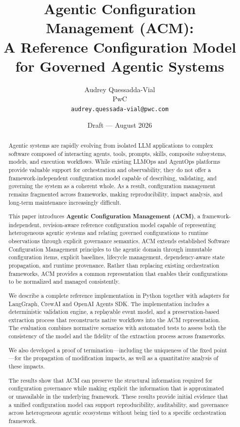 \documentclass[10pt]{article}
\title{\textbf{Agentic Configuration Management (ACM):\\A Reference Configuration Model for Governed Agentic Systems}}
\author{
  Audrey Quessadda-Vial\\
  PwC\\
  \texttt{audrey.quessada-vial@pwc.com}
}
\date{Draft --- August 2026}
\begin{document}
\maketitle

\begin{abstract}

Agentic systems are rapidly evolving from isolated LLM applications to complex software composed of interacting agents, tools, prompts, skills, composite subsystems, models, and execution workflows. While existing LLMOps and AgentOps platforms provide valuable support for orchestration and observability, they do not offer a framework-independent configuration model capable of describing, validating, and governing the system as a coherent whole. As a result, configuration management remains fragmented across frameworks, making reproducibility, impact analysis, and long-term maintenance increasingly difficult.

This paper introduces \textbf{Agentic Configuration Management (ACM)}, a framework-independent, revision-aware reference configuration model capable of representing heterogeneous agentic systems and relating governed configurations to runtime observations through explicit governance semantics. ACM extends established Software Configuration Management principles to the agentic domain through immutable configuration items, explicit baselines, lifecycle management, dependency-aware state propagation, and runtime provenance. Rather than replacing existing orchestration frameworks, ACM provides a common representation that enables their configurations to be normalized and managed consistently.

We describe a complete reference implementation in Python together with adapters for LangGraph, CrewAI and OpenAI Agents SDK. The implementation includes a deterministic validation engine, a replayable event model, and a preservation-based extraction process that reconstructs native workflows into the ACM representation. The evaluation combines normative scenarios with automated tests to assess both the consistency of the model and the fidelity of the extraction process across frameworks.

We also developed a proof of termination—including the uniqueness of the fixed point—for the propagation of modification impacts, as well as a quantitative analysis of these impacts. 

The results show that ACM can preserve the structural information required for configuration governance while making explicit the information that is approximated or unavailable in the underlying framework. These results provide initial evidence that a unified configuration model can support reproducibility, auditability, and governance across heterogeneous agentic ecosystems without being tied to a specific orchestration framework.

\end{abstract}
\end{document}
